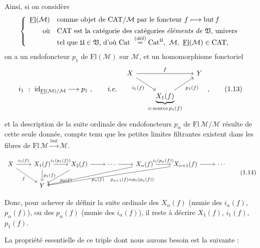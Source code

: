 \documentclass[11pt]{article}
\newcommand{\msp}[1]{\marginpar{\footnotesize [#1]}}
\newcommand{\cM}{\mathcal{M}}
\newcommand{\Flu}{\underline{\mathrm{Fl}}}
\newcommand{\fU}{\mathfrak{U}}
\newcommand{\fV}{\mathfrak{V}}
\begin{document}
Ainsi, si on considère
\[
\left\{
\begin{array}{rl}
\Flu(\cM) & \text{comme objet de CAT}/\cM \text{ par le foncteur } f \longmapsto \text{but}\, f\\[1ex]
\text{où} & \text{CAT est la catégorie des catégories \textit{éléments de} } \fV\text{\textit{,} univers}\\
 & \text{tel que } \fU \in \fV\text{, d'où Cat } \overset{\text{(déf)}}{=} \mathrm{Cat}^{\fU},\ \cM,\ \Flu(\cM) \in \text{CAT} ,
\end{array}
\right.
\]
on a un endofoncteur $p_1$ de $\Flu(\cM)$ sur $\cM$, et un homomorphisme fonctoriel
\[
i_1 \ : \ \mathrm{id}_{\Flu(\cM)/\cM} \longrightarrow p_1 \ , \qquad \textit{i.e.} \quad
\begin{tikzcd}[column sep=small]
X \arrow[rr, "f"] \arrow[dr, "i_1(f)"'] & & Y \\
 & \underbrace{X_1(f)}_{=\,\text{source}\, p_1(f)} \arrow[ur, "p_1(f)"'] &
\end{tikzcd} \ ,
\tag*{(1.13)}
\]
et la description de la suite ordinale des endofoncteurs $p_\alpha$ de $\Flu\,\cM/\cM$ résulte de cette seule donnée, compte tenu que les petites limites filtrantes existent dans les fibres de $\Flu\,\cM \xrightarrow{\text{but}} \cM$.

\msp{page 5}

\[
\begin{tikzcd}[column sep=normal]
X \arrow[r, "i_1(f)"] \arrow[dr, "f"'] & X_1(f) \arrow[r, "i_1(p_1(f))"] \arrow[d, "p_1(f)"] & X_2(f) \arrow[r] \arrow[dl, "p_2(f)"] & \cdots \arrow[r] & X_\alpha(f) \arrow[r, "i_1(p_\alpha(f))"] \arrow[dlll, "p_\alpha(f)"] & X_{\alpha+1}(f) \arrow[r] \arrow[dllll, "p_{\alpha+1}(f) = p_1(p_\alpha(f))"] & \cdots \\
 & Y & & & & &
\end{tikzcd}
\tag*{(1.14)}
\]

Donc, pour achever de définir la suite ordinale des $X_\alpha(f)$ (munie des $i_\alpha(f)$, $p_\alpha(f)$), ou des $p_\alpha(f)$ (munie des $i_\alpha(f)$), il reste à décrire $X_1(f)$, $i_1(f)$, $p_1(f)$.

La propriété essentielle de ce triple dont nous aurons besoin est la suivante :
\end{document}
